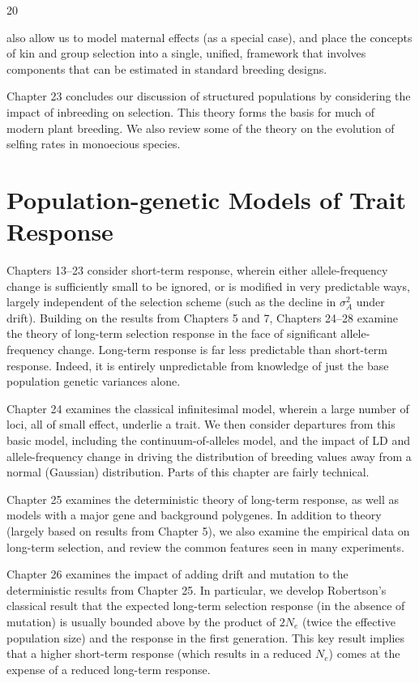 \documentclass{article}
\begin{document}
20

also allow us to model maternal effects (as a special case), and place the concepts of kin and group selection into a single, unified, framework that involves components that can be estimated in standard breeding designs.

Chapter 23 concludes our discussion of structured populations by considering the impact of inbreeding on selection. This theory forms the basis for much of modern plant breeding. We also review some of the theory on the evolution of selfing rates in monoecious species.

\section{Population-genetic Models of Trait Response}
Chapters 13–23 consider short-term response, wherein either allele-frequency change is sufficiently small to be ignored, or is modified in very predictable ways, largely independent of the selection scheme (such as the decline in  $ \sigma_{A}^{2} $ under drift). Building on the results from Chapters 5 and 7, Chapters 24–28 examine the theory of long-term selection response in the face of significant allele-frequency change. Long-term response is far less predictable than short-term response. Indeed, it is entirely unpredictable from knowledge of just the base population genetic variances alone.

Chapter 24 examines the classical infinitesimal model, wherein a large number of loci, all of small effect, underlie a trait. We then consider departures from this basic model, including the continuum-of-alleles model, and the impact of LD and allele-frequency change in driving the distribution of breeding values away from a normal (Gaussian) distribution. Parts of this chapter are fairly technical.

Chapter 25 examines the deterministic theory of long-term response, as well as models with a major gene and background polygenes. In addition to theory (largely based on results from Chapter 5), we also examine the empirical data on long-term selection, and review the common features seen in many experiments.

Chapter 26 examines the impact of adding drift and mutation to the deterministic results from Chapter 25. In particular, we develop Robertson's classical result that the expected long-term selection response (in the absence of mutation) is usually bounded above by the product of  $ 2N_{e} $ (twice the effective population size) and the response in the first generation. This key result implies that a higher short-term response (which results in a reduced  $ N_{e} $) comes at the expense of a reduced long-term response.
\end{document}

